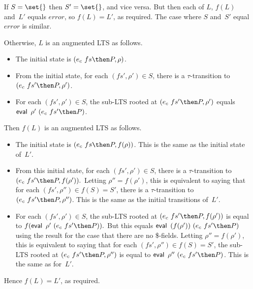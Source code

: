 If $S = \set{}$ then $S' = \set{}$, and vice versa.   But then each of $L$,
$f(L)$ and~$L'$ equals $error$, so $f(L) = L'$, as required.  The case where
$S$ and~$S'$ equal $error$ is similar.

Otherwise, $L$ is an augmented LTS as follows.
\begin{itemize}
\item The initial state is $(e_c~fs \then P, \rho)$.

\item From the initial state, for each $(fs',\rho') \in S$, there is a
  $\tau$-transition to $(e_c~fs' \then P, \rho')$.

\item For each $(fs',\rho') \in S$, the sub-LTS rooted at
  $(e_c~fs' \then P, \rho')$ equals $\eval~\rho'~(e_c~fs' \then P)$.
\end{itemize}

%
Then $f(L)$ is an augmented LTS as follows.
\begin{itemize}
\item The initial state is
  $(e_c~fs \then P, f(\rho))$.  This is the
  same as the initial state of~$L'$.

\item From this initial state, for each $(fs',\rho') \in S$, there is a
  $\tau$-transition to
  \(
  (e_c~fs' \then P, f(\rho')). 
  \)
  Letting $\rho'' = f(\rho')$, this is equivalent to
  saying that for each $(fs',\rho'') \in f(S) = S'$, there is a
  $\tau$-transition to $(e_c~fs' \then P,\linebreak[1] \rho'')$.
  This is the same as the initial transitions of~$L'$.

\item For each $(fs',\rho') \in S$, the sub-LTS rooted at
  $(e_c~fs' \then  P,\linebreak[2]
    {f(\rho')})$ is 
  equal to 
  \( f(\eval~\rho'~(e_c~fs' \then P)) . \)
  But this equals $\eval~{(f(\rho'))} ~ (e_c~fs' \then P)$
  using the result for the case that there are no \$-fields.
  Letting 
  $\rho'' = f(\rho')$, this is equivalent to saying that for each
  $(fs',\rho'') \in f(S) = S'$, the sub-LTS rooted at
  $(e_c~fs' \then P, \linebreak[2] \rho'')$ is equal to
  $\eval~\rho''~(e_c~fs' \then P)$.  This is the same as for~$L'$.
\end{itemize}
%
Hence $f(L) = L'$, as required.



